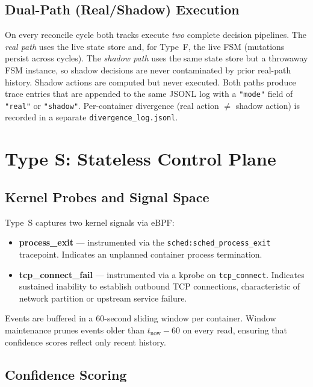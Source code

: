 \documentclass[runningheads]{llncs}
\begin{document}
\subsection{Dual-Path (Real/Shadow) Execution}

On every reconcile cycle both tracks execute \emph{two} complete
decision pipelines.  The \emph{real path} uses the live state store
and, for Type~F, the live FSM (mutations persist across cycles).  The
\emph{shadow path} uses the same state store but a throwaway FSM
instance, so shadow decisions are never contaminated by prior real-path
history. Shadow actions are computed but never executed. Both paths
produce trace entries that are appended to the same JSONL log with a
\texttt{"mode"} field of \texttt{"real"} or \texttt{"shadow"}.  Per-container
divergence (real action $\neq$ shadow action) is recorded in a
separate \texttt{divergence\_log.jsonl}.

\section{Type S: Stateless Control Plane}
\label{sec:typeS}

\subsection{Kernel Probes and Signal Space}

Type~S captures two kernel signals via eBPF:
\begin{itemize}
  \item \textbf{process\_exit} --- instrumented via the
    \texttt{sched:sched\_process\_exit} tracepoint.  Indicates an
    unplanned container process termination.
  \item \textbf{tcp\_connect\_fail} --- instrumented via a kprobe on
    \texttt{tcp\_connect}. Indicates sustained inability to establish
    outbound TCP connections, characteristic of network partition or
    upstream service failure.
\end{itemize}

Events are buffered in a 60-second sliding window per container.
Window maintenance prunes events older than $t_\text{now} - 60$ on
every read, ensuring that confidence scores reflect only recent history.

\subsection{Confidence Scoring}
\end{document}
